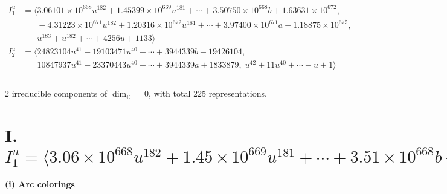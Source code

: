 \documentclass[1p]{elsarticle_modified}
\theoremstyle{definition}
\begin{document}
\begin{align*}
I^u_{1}&=\langle 
3.06101\times10^{668} u^{182}+1.45399\times10^{669} u^{181}+\cdots+3.50750\times10^{668} b+1.63631\times10^{672},\\
\phantom{I^u_{1}}&\phantom{= \langle  }-4.31223\times10^{671} u^{182}+1.20316\times10^{672} u^{181}+\cdots+3.97400\times10^{671} a+1.18875\times10^{675},\\
\phantom{I^u_{1}}&\phantom{= \langle  }u^{183}+u^{182}+\cdots+4256 u+1133\rangle \\
I^u_{2}&=\langle 
24823104 u^{41}-19103471 u^{40}+\cdots+3944339 b-19426104,\\
\phantom{I^u_{2}}&\phantom{= \langle  }10847937 u^{41}-23370443 u^{40}+\cdots+3944339 a+1833879,\;u^{42}+11 u^{40}+\cdots- u+1\rangle \\
\\
\end{align*}
\raggedright * 2 irreducible components of $\dim_{\mathbb{C}}=0$, with total 225 representations.\\
\newpage
\renewcommand{\arraystretch}{1}
\centering \section*{I. $I^u_{1}= \langle 3.06\times10^{668} u^{182}+1.45\times10^{669} u^{181}+\cdots+3.51\times10^{668} b+1.64\times10^{672},\;-4.31\times10^{671} u^{182}+1.20\times10^{672} u^{181}+\cdots+3.97\times10^{671} a+1.19\times10^{675},\;u^{183}+u^{182}+\cdots+4256 u+1133 \rangle$}
\flushleft \textbf{(i) Arc colorings}\\
\end{document}
